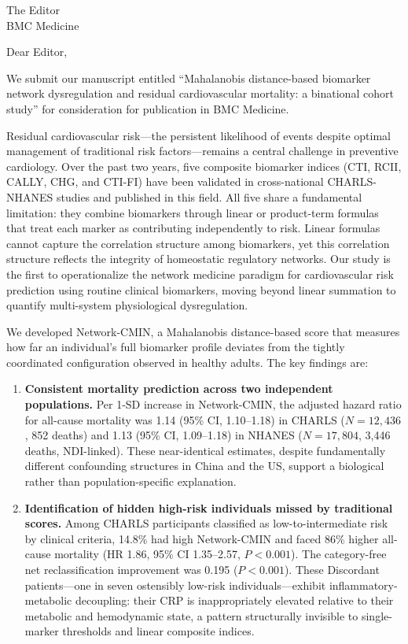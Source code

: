 \documentclass[11pt]{letter}
\begin{document}
\begin{letter}{The Editor\\
BMC Medicine}

\opening{Dear Editor,}

We submit our manuscript entitled ``Mahalanobis distance-based biomarker network dysregulation and residual cardiovascular mortality: a binational cohort study'' for consideration for publication in BMC Medicine.

Residual cardiovascular risk---the persistent likelihood of events despite optimal management of traditional risk factors---remains a central challenge in preventive cardiology. Over the past two years, five composite biomarker indices (CTI, RCII, CALLY, CHG, and CTI-FI) have been validated in cross-national CHARLS-NHANES studies and published in this field. All five share a fundamental limitation: they combine biomarkers through linear or product-term formulas that treat each marker as contributing independently to risk. Linear formulas cannot capture the correlation structure among biomarkers, yet this correlation structure reflects the integrity of homeostatic regulatory networks. Our study is the first to operationalize the network medicine paradigm for cardiovascular risk prediction using routine clinical biomarkers, moving beyond linear summation to quantify multi-system physiological dysregulation.

We developed Network-CMIN, a Mahalanobis distance-based score that measures how far an individual's full biomarker profile deviates from the tightly coordinated configuration observed in healthy adults. The key findings are:

\begin{enumerate}
\item \textbf{Consistent mortality prediction across two independent populations.} Per 1-SD increase in Network-CMIN, the adjusted hazard ratio for all-cause mortality was 1.14 (95\% CI, 1.10--1.18) in CHARLS ($N = 12{,}436$, 852 deaths) and 1.13 (95\% CI, 1.09--1.18) in NHANES ($N = 17{,}804$, 3,446 deaths, NDI-linked). These near-identical estimates, despite fundamentally different confounding structures in China and the US, support a biological rather than population-specific explanation.

\item \textbf{Identification of hidden high-risk individuals missed by traditional scores.} Among CHARLS participants classified as low-to-intermediate risk by clinical criteria, 14.8\% had high Network-CMIN and faced 86\% higher all-cause mortality (HR 1.86, 95\% CI 1.35--2.57, $P < 0.001$). The category-free net reclassification improvement was 0.195 ($P < 0.001$). These Discordant patients---one in seven ostensibly low-risk individuals---exhibit inflammatory-metabolic decoupling: their CRP is inappropriately elevated relative to their metabolic and hemodynamic state, a pattern structurally invisible to single-marker thresholds and linear composite indices.


\end{enumerate}
\end{letter}
\end{document}
